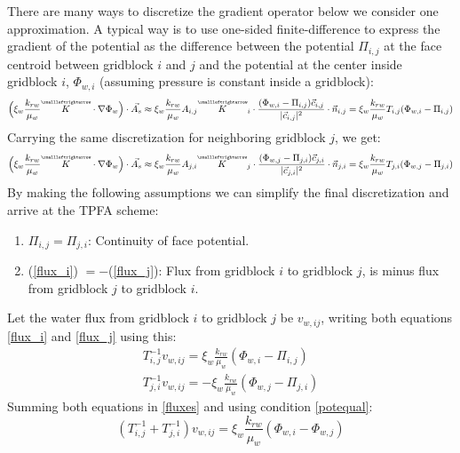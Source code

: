 There are many ways to discretize the gradient operator below we consider one approximation. A typical way is to use one-sided finite-difference to express the gradient of the potential as the difference between the potential $\Pi_{i,j}$
at the face centroid between gridblock $i$ and $j$ and the potential at the center inside gridblock $i$, $\Phi_{w,i}$ (assuming pressure is constant inside a gridblock):
\begin{equation}
	\Big(\xi_{w}\frac{k_{rw}}{\mu_{w}}\tensor{K}\cdot \nabla\Phi_{w}\Big)\cdot\vec{A_{s}} \approx \xi_{w}\frac{k_{rw}}{\mu_{w}}A_{i,j}\tensor{K}_{i}\cdot\frac{(\Phi_{w,i}-\Pi_{i,j})\vec{c}_{i,j}}{|\vec{c}_{i,j}|^{2}}\cdot\vec{n}_{i,j} = \xi_{w}\frac{k_{rw}}{\mu_{w}}T_{i,j} (\Phi_{w,i}-\Pi_{i,j})
	\label{flux_i}
\end{equation}
Carrying the same discretization for neighboring gridblock $j$, we get:
\begin{equation}
	\Big(\xi_{w}\frac{k_{rw}}{\mu_{w}}\tensor{K}\cdot \nabla\Phi_{w}\Big)\cdot\vec{A_{s}} \approx \xi_{w}\frac{k_{rw}}{\mu_{w}}A_{j,i}\tensor{K}_{j}\cdot\frac{(\Phi_{w,j}-\Pi_{j,i})\vec{c}_{j,i}}{|\vec{c}_{j,i}|^{2}}\cdot\vec{n}_{j,i} = \xi_{w}\frac{k_{rw}}{\mu_{w}}T_{j,i} (\Phi_{w,j}-\Pi_{j,i})
	\label{flux_j}
\end{equation}
By making the following assumptions we can simplify the final discretization and arrive at the TPFA scheme:
\begin{enumerate}[label=\color{alizarin}\Roman*.]
	\item $\Pi_{i,j} = \Pi_{j,i}$: Continuity of face potential.
	\item\label{potequal} (\ref{flux_i}) $=-$(\ref{flux_j}): Flux from gridblock $i$ to gridblock $j$, is minus flux from gridblock $j$ to gridblock $i$.
\end{enumerate}
Let the water flux from gridblock $i$ to gridblock $j$ be $v_{w, ij}$, writing both equations \ref{flux_i} and \ref{flux_j} using this:
\begin{align}
T_{i,j}^{-1}v_{w, ij} = \xi_{w}\frac{k_{rw}}{\mu_{w}} (\Phi_{w,i}-\Pi_{i,j})\nonumber \\
T_{j,i}^{-1}v_{w, ij} = -\xi_{w}\frac{k_{rw}}{\mu_{w}}(\Phi_{w,j}-\Pi_{j,i})
\label{fluxes}
\end{align}
Summing both equations in \ref{fluxes} and using condition \ref{potequal}:
\begin{equation}
(T_{i,j}^{-1}+T_{j,i}^{-1})v_{w, ij} = \xi_{w}\frac{k_{rw}}{\mu_{w}} (\Phi_{w,i}-\Phi_{w,j})
\end{equation}
